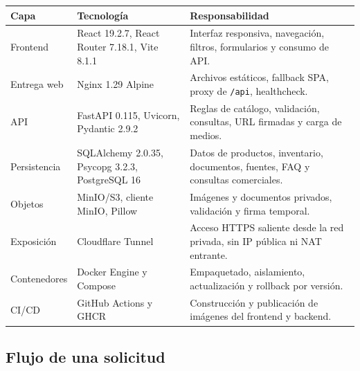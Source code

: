 \documentclass[11pt,a4paper]{article}
\newcommand{\code}[1]{\nolinkurl{#1}}
\begin{document}
\begin{tabularx}{\textwidth}{L{3.3cm}L{4.2cm}Y}
\toprule
\textbf{Capa} & \textbf{Tecnología} & \textbf{Responsabilidad}\\
\midrule
Frontend & React 19.2.7, React Router 7.18.1, Vite 8.1.1 & Interfaz responsiva, navegación, filtros, formularios y consumo de API.\\
Entrega web & Nginx 1.29 Alpine & Archivos estáticos, fallback SPA, proxy de \code{/api}, healthcheck.\\
API & FastAPI 0.115, Uvicorn, Pydantic 2.9.2 & Reglas de catálogo, validación, consultas, URL firmadas y carga de medios.\\
Persistencia & SQLAlchemy 2.0.35, Psycopg 3.2.3, PostgreSQL 16 & Datos de productos, inventario, documentos, fuentes, FAQ y consultas comerciales.\\
Objetos & MinIO/S3, cliente MinIO, Pillow & Imágenes y documentos privados, validación y firma temporal.\\
Exposición & Cloudflare Tunnel & Acceso HTTPS saliente desde la red privada, sin IP pública ni NAT entrante.\\
Contenedores & Docker Engine y Compose & Empaquetado, aislamiento, actualización y rollback por versión.\\
CI/CD & GitHub Actions y GHCR & Construcción y publicación de imágenes del frontend y backend.\\
\bottomrule
\end{tabularx}

\subsection{Flujo de una solicitud}

\begin{center}
\end{center}
\end{document}
